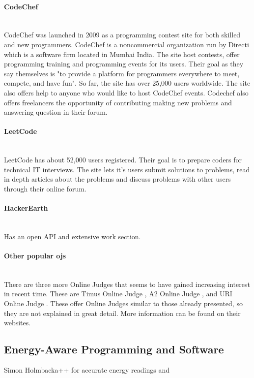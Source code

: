 \paragraph*{CodeChef} \hfill \\
CodeChef \cite{m:codechef} was launched in 2009 as a programming contest site for both skilled and new programmers. CodeChef is a noncommercial organization run by Directi which is a software firm located in Mumbai India. The site host contests, offer programming training and programming events for its users. Their goal as they say themselves is "to provide a platform for programmers everywhere to meet, compete, and have fun". So far, the site has over 25,000 users worldwide. The site also offers help to anyone who would like to host CodeChef events. Codechef also offers freelancers the opportunity of contributing making new problems and answering question in their forum.

\paragraph*{LeetCode} \hfill \\
LeetCode has about 52,000 users registered. Their goal is to prepare coders for technical IT interviews. The site lets it's users submit solutions to problems, read in depth articles about the problems and discuss problems with other users through their online forum.

\paragraph*{HackerEarth} \hfill \\
Has an open API and extensive work section.

\paragraph*{Other popular \gls{ojs}} \hfill \\
There are three more Online Judges that seems to have gained increasing interest in recent time. These are Timus Online Judge \cite{m:timus}, A2 Online Judge \cite{m:A2}, and URI Online Judge \cite{m:urioj}. These offer Online Judges similar to those already presented, so they are not explained in great detail. More information can be found on their websites.

\subsection{Energy-Aware Programming and Software}
Simon Holmbacka++ for accurate energy readings and
